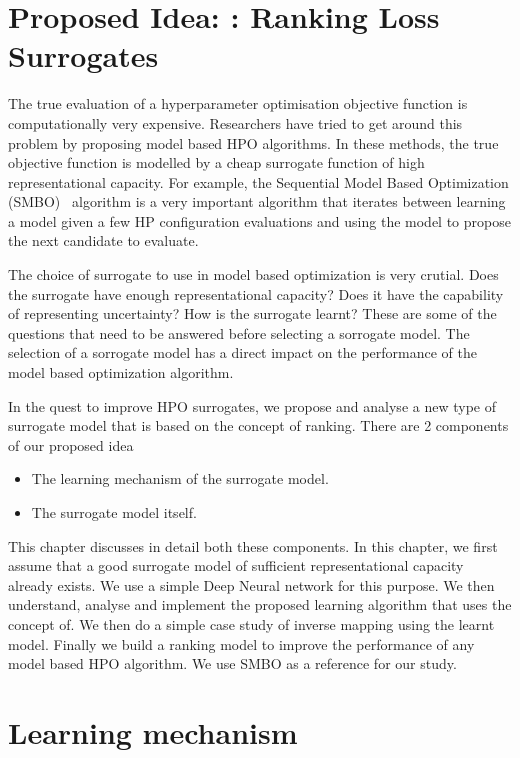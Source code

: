 \documentclass[11pt]{report}
\begin{document}
\section{Proposed Idea: : Ranking Loss Surrogates}

The true evaluation of a hyperparameter optimisation objective function is computationally very expensive. 
Researchers have tried to get around this problem by proposing model based HPO algorithms.
In these methods,  the true objective function is modelled by a cheap surrogate function of high representational capacity.
For example,  the Sequential Model Based Optimization (SMBO)~\cite{NIPS2011_86e8f7ab} algorithm is a very important algorithm that iterates between learning a model given a few HP configuration evaluations and using the model to propose the next candidate to evaluate.

The choice of surrogate to use in model based optimization is very crutial.
Does the surrogate have enough representational capacity?
Does it have the capability of representing uncertainty?
How is the surrogate learnt?
These are some of the questions that need to be answered before selecting a sorrogate model.
The selection of a sorrogate model has a direct impact on the performance of the model based optimization algorithm.

In the quest to improve HPO surrogates,  we propose and analyse a new type of surrogate model that is based on the concept of ranking.
There are 2 components of our proposed idea

\begin{itemize}
\item The learning mechanism of the surrogate model.
\item The surrogate model itself.
\end{itemize}

This chapter discusses in detail both these components.
In this chapter,  we first assume that a good surrogate model of sufficient representational capacity already exists.
We use a simple Deep Neural network for this purpose.
We then understand,  analyse and implement the proposed learning algorithm that uses the concept of.
We then do a simple case study of inverse mapping using the learnt model.
Finally we build a ranking model to improve the performance of any model based HPO algorithm.
We use SMBO as a reference for our study.


\section{Learning mechanism}
\end{document}
